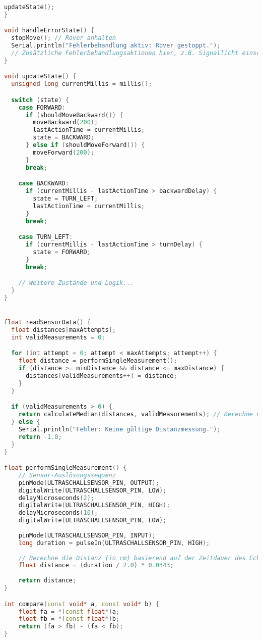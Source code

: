 \documentclass{vorlage-design-main}
\begin{document}
\begin{lstlisting}[language={C++}]
  updateState();
}

void handleErrorState() {
  stopMove(); // Rover anhalten
  Serial.println("Fehlerbehandlung aktiv: Rover gestoppt.");
  // Zusätzliche Fehlerbehandlungsaktionen hier, z.B. Signallicht einschalten, etc.
}

void updateState() {
  unsigned long currentMillis = millis();

  switch (state) {
    case FORWARD:
      if (shouldMoveBackward()) {
        moveBackward(200);
        lastActionTime = currentMillis;
        state = BACKWARD;
      } else if (shouldMoveForward()) {
        moveForward(200);
      }
      break;

    case BACKWARD:
      if (currentMillis - lastActionTime > backwardDelay) {
        state = TURN_LEFT;
        lastActionTime = currentMillis;
      }
      break;

    case TURN_LEFT:
      if (currentMillis - lastActionTime > turnDelay) {
        state = FORWARD;
      }
      break;

    // Weitere Zustände und Logik...
  }
}


float readSensorData() {
  float distances[maxAttempts];
  int validMeasurements = 0;

  for (int attempt = 0; attempt < maxAttempts; attempt++) {
    float distance = performSingleMeasurement();
    if (distance >= minDistance && distance <= maxDistance) {
      distances[validMeasurements++] = distance;
    }
  }

  if (validMeasurements > 0) {
    return calculateMedian(distances, validMeasurements); // Berechne den Median der gültigen Messungen
  } else {
    Serial.println("Fehler: Keine gültige Distanzmessung.");
    return -1.0;
  }
}

float performSingleMeasurement() {
    // Sensor-Auslösungssequenz
    pinMode(ULTRASCHALLSENSOR_PIN, OUTPUT);
    digitalWrite(ULTRASCHALLSENSOR_PIN, LOW);
    delayMicroseconds(2);
    digitalWrite(ULTRASCHALLSENSOR_PIN, HIGH);
    delayMicroseconds(10);
    digitalWrite(ULTRASCHALLSENSOR_PIN, LOW);
    
    pinMode(ULTRASCHALLSENSOR_PIN, INPUT);
    long duration = pulseIn(ULTRASCHALLSENSOR_PIN, HIGH);
    
    // Berechne die Distanz (in cm) basierend auf der Zeitdauer des Echo-Signals
    float distance = (duration / 2.0) * 0.0343;
    
    return distance;
}

int compare(const void* a, const void* b) {
    float fa = *(const float*)a;
    float fb = *(const float*)b;
    return (fa > fb) - (fa < fb);
}


\end{lstlisting}
\end{document}
